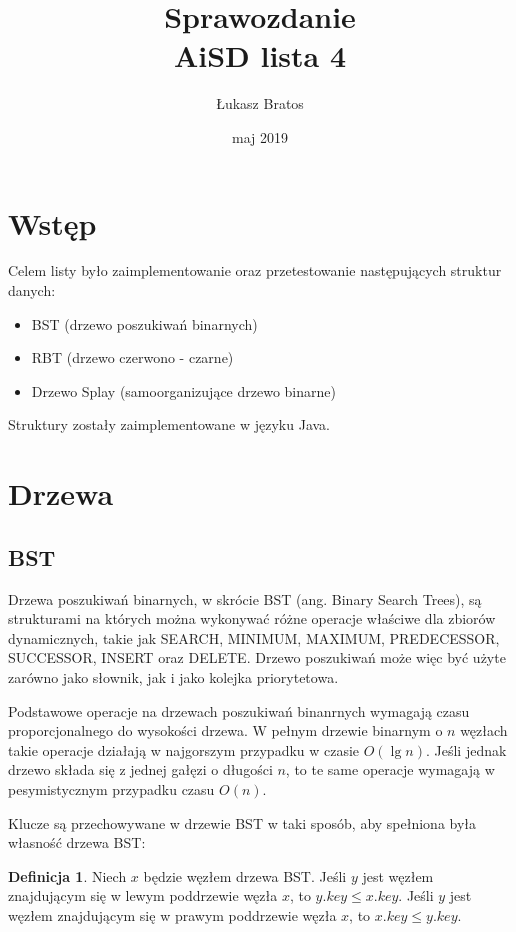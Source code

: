 \documentclass[10pt,a4paper]{article}
\author{Łukasz Bratos}
\title{Sprawozdanie\\
    AiSD lista 4}
\date{maj 2019}
\theoremstyle{definition}
\theoremstyle{definition}
\theoremstyle{definition}
\newtheorem{defi}{Definicja}
\begin{document}
\maketitle

\section{Wstęp}
    Celem listy było zaimplementowanie oraz przetestowanie następujących struktur danych:
    \begin{itemize}
        \item BST (drzewo poszukiwań binarnych)
        \item RBT (drzewo czerwono - czarne)
        \item Drzewo Splay (samoorganizujące drzewo binarne)
    \end{itemize}
    
    Struktury zostały zaimplementowane w języku Java.
\section{Drzewa}
    \subsection{BST}
        Drzewa poszukiwań binarnych, w skrócie BST (ang. Binary Search Trees), są strukturami na których można wykonywać różne operacje właściwe dla zbiorów dynamicznych, takie jak SEARCH, MINIMUM, MAXIMUM, PREDECESSOR, SUCCESSOR, INSERT oraz DELETE. Drzewo poszukiwań może więc być użyte zarówno jako słownik, jak i jako kolejka priorytetowa.
        
        Podstawowe operacje na drzewach poszukiwań binanrnych wymagają czasu proporcjonalnego do wysokości drzewa. W pełnym drzewie binarnym o $n$ węzłach takie operacje działają w najgorszym przypadku w czasie $O(\lg n)$. Jeśli jednak drzewo składa się z jednej gałęzi o długości $n$, to te same operacje wymagają w pesymistycznym przypadku czasu $O(n)$.
        
        Klucze są przechowywane w drzewie BST w taki sposób, aby spełniona była własność drzewa BST:
        \begin{defi}
            Niech $x$ będzie węzłem drzewa BST. Jeśli $y$ jest węzłem znajdującym się w lewym poddrzewie węzła $x$, to $y.key \leq x.key$. Jeśli $y$ jest węzłem znajdującym się w prawym poddrzewie węzła $x$, to $x.key \leq y.key$.
        \end{defi}
        
\end{document}
